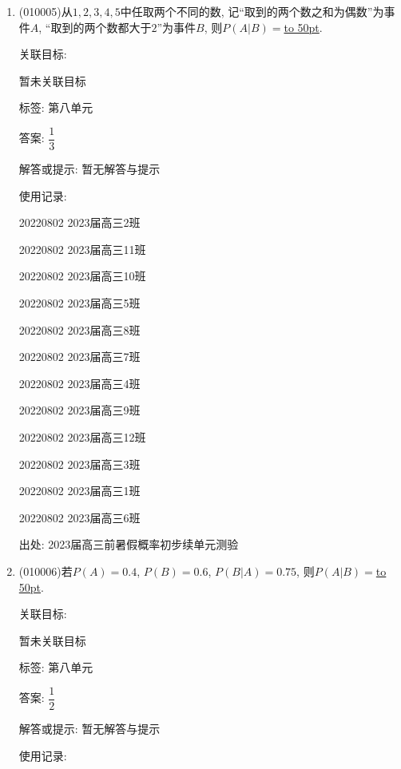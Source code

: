 \documentclass[10pt,a4paper]{article}
\newcommand{\blank}[1]{\underline{\hbox to #1pt{}}}
\begin{document}
\begin{enumerate}[1.]

\item { (010005)}从$1,2,3,4,5$中任取两个不同的数, 记``取到的两个数之和为偶数''为事件$A$, ``取到的两个数都大于$2$''为事件$B$, 则$P(A|B)=$\blank{50}.


关联目标:

暂未关联目标



标签: 第八单元

答案: $\dfrac 13$

解答或提示: 暂无解答与提示

使用记录:

20220802	2023届高三2班	

20220802	2023届高三11班	

20220802	2023届高三10班	

20220802	2023届高三5班	

20220802	2023届高三8班	

20220802	2023届高三7班	

20220802	2023届高三4班	

20220802	2023届高三9班	

20220802	2023届高三12班	

20220802	2023届高三3班	

20220802	2023届高三1班	

20220802	2023届高三6班	


出处: 2023届高三前暑假概率初步续单元测验
\item { (010006)}若$P(A)=0.4$, $P(B)=0.6$, $P(B|A)=0.75$, 则$P(A|B)=$\blank{50}.


关联目标:

暂未关联目标



标签: 第八单元

答案: $\dfrac 12$

解答或提示: 暂无解答与提示

使用记录:


\end{enumerate}
\end{document}
